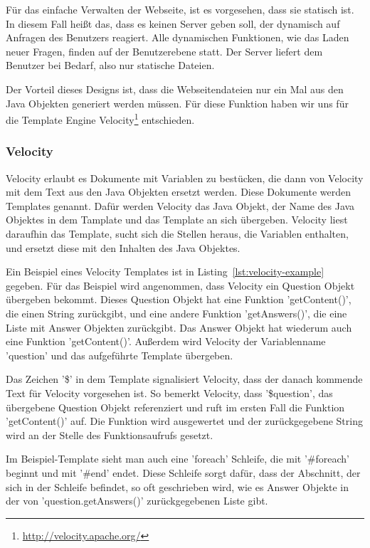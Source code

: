 \label{Sokol}
Für das einfache Verwalten der Webseite, ist es vorgesehen, dass sie statisch ist.
In diesem Fall heißt das, dass es keinen Server geben soll, der dynamisch auf Anfragen des Benutzers reagiert.
Alle dynamischen Funktionen, wie das Laden neuer Fragen, finden auf der Benutzerebene statt.
Der Server liefert dem Benutzer bei Bedarf, also nur statische Dateien.

Der Vorteil dieses Designs ist, dass die Webseitendateien nur ein Mal aus den Java Objekten generiert werden müssen.
Für diese Funktion haben wir uns für die Template Engine Velocity\footnote{\url{http://velocity.apache.org/}} entschieden.

\subsubsection{Velocity}

Velocity erlaubt es Dokumente mit Variablen zu bestücken, die dann von Velocity mit dem Text aus den Java Objekten ersetzt werden.
Diese Dokumente werden Templates genannt.
Dafür werden Velocity das Java Objekt, der Name des Java Objektes in dem Tamplate und das Template an sich übergeben.
Velocity liest daraufhin das Template, sucht sich die Stellen heraus, die Variablen enthalten, und ersetzt diese mit den Inhalten des Java Objektes.

Ein Beispiel eines Velocity Templates ist in Listing~\ref{lst:velocity-example} gegeben.
Für das Beispiel wird angenommen, dass Velocity ein Question Objekt übergeben bekommt.
Dieses Question Objekt hat eine Funktion 'getContent()', die einen String zurückgibt, und eine andere Funktion 'getAnswers()', die eine Liste mit Answer Objekten zurückgibt.
Das Answer Objekt hat wiederum auch eine Funktion 'getContent()'.
Außerdem wird Velocity der Variablenname 'question' und das aufgeführte Template übergeben.

Das Zeichen '\$' in dem Template signalisiert Velocity, dass der danach kommende Text für Velocity vorgesehen ist.
So bemerkt Velocity, dass '\$question', das übergebene Question Objekt referenziert und ruft im ersten Fall die Funktion 'getContent()' auf.
Die Funktion wird ausgewertet und der zurückgegebene String wird an der Stelle des Funktionsaufrufs gesetzt.

Im Beispiel-Template sieht man auch eine 'foreach' Schleife, die mit '\#foreach' beginnt und mit '\#end' endet.
Diese Schleife sorgt dafür, dass der Abschnitt, der sich in der Schleife befindet, so oft geschrieben wird, wie es Answer Objekte in der von 'question.getAnswers()' zurückgegebenen Liste gibt.

